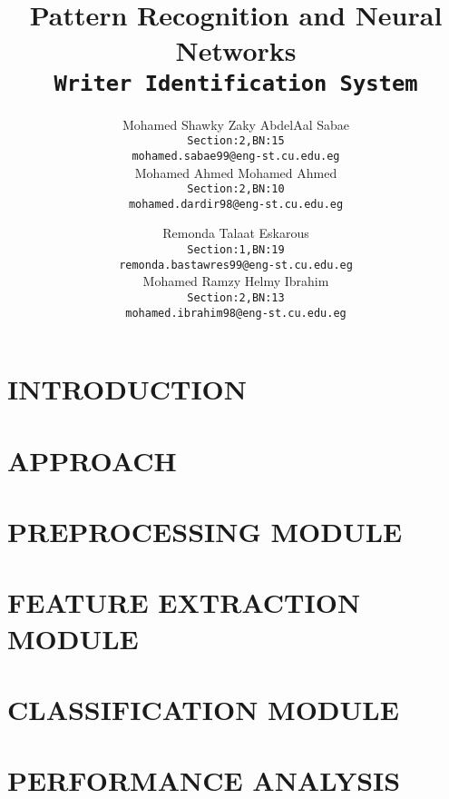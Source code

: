 \documentclass[letterpaper, 10 pt, conference]{ieeeconf}  %
\title{\LARGE \bf
Pattern Recognition and Neural Networks\\
\texttt{Writer Identification System}
}
\author{
  Mohamed Shawky Zaky AbdelAal Sabae\\
  \texttt{Section:2,BN:15}\\
  \texttt{mohamed.sabae99@eng-st.cu.edu.eg} \\

  Mohamed Ahmed Mohamed Ahmed\\
  \texttt{Section:2,BN:10}\\
  \texttt{mohamed.dardir98@eng-st.cu.edu.eg}
  \and
  Remonda Talaat Eskarous\\
  \texttt{Section:1,BN:19}\\
  \texttt{remonda.bastawres99@eng-st.cu.edu.eg} \\
  
  Mohamed Ramzy Helmy Ibrahim\\
  \texttt{Section:2,BN:13}\\
  \texttt{mohamed.ibrahim98@eng-st.cu.edu.eg}
}
\begin{document}
\maketitle
\thispagestyle{empty}
\pagestyle{empty}


\begin{abstract}

\end{abstract}


\section{INTRODUCTION}



\section{APPROACH}



\section{PREPROCESSING MODULE}



\section{FEATURE EXTRACTION MODULE}



\section{CLASSIFICATION MODULE}



\section{PERFORMANCE ANALYSIS}

\end{document}
